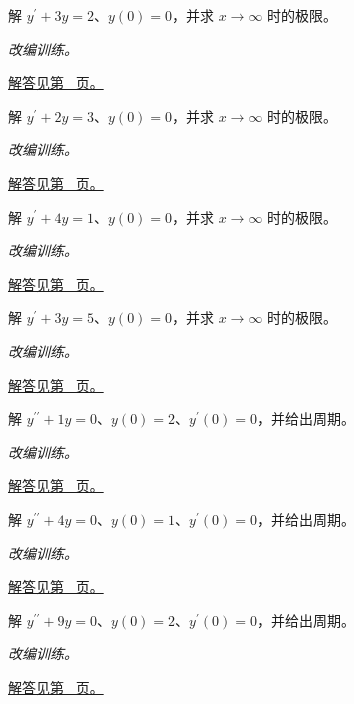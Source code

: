 \documentclass[12pt,fontset=fandol]{ctexart}
\begin{document}
\begin{example}[积分因子解线性方程]\label{ex:c22q15}
解 $y^{\prime}+3y=2$、$y(0)=0$，并求 $x\to\infty$ 时的极限。
\par\textit{改编训练。}\par\hyperref[ans:c22q15]{解答见第~\pageref{ans:c22q15} 页。}
\end{example}
\begin{example}[积分因子解线性方程]\label{ex:c22q16}
解 $y^{\prime}+2y=3$、$y(0)=0$，并求 $x\to\infty$ 时的极限。
\par\textit{改编训练。}\par\hyperref[ans:c22q16]{解答见第~\pageref{ans:c22q16} 页。}
\end{example}
\begin{example}[积分因子解线性方程]\label{ex:c22q17}
解 $y^{\prime}+4y=1$、$y(0)=0$，并求 $x\to\infty$ 时的极限。
\par\textit{改编训练。}\par\hyperref[ans:c22q17]{解答见第~\pageref{ans:c22q17} 页。}
\end{example}
\begin{example}[积分因子解线性方程]\label{ex:c22q18}
解 $y^{\prime}+3y=5$、$y(0)=0$，并求 $x\to\infty$ 时的极限。
\par\textit{改编训练。}\par\hyperref[ans:c22q18]{解答见第~\pageref{ans:c22q18} 页。}
\end{example}
\begin{example}[简谐振动初值问题]\label{ex:c22q19}
解 $y^{\prime\prime}+1y=0$、$y(0)=2$、$y^{\prime}(0)=0$，并给出周期。
\par\textit{改编训练。}\par\hyperref[ans:c22q19]{解答见第~\pageref{ans:c22q19} 页。}
\end{example}
\begin{example}[简谐振动初值问题]\label{ex:c22q20}
解 $y^{\prime\prime}+4y=0$、$y(0)=1$、$y^{\prime}(0)=0$，并给出周期。
\par\textit{改编训练。}\par\hyperref[ans:c22q20]{解答见第~\pageref{ans:c22q20} 页。}
\end{example}
\begin{example}[简谐振动初值问题]\label{ex:c22q21}
解 $y^{\prime\prime}+9y=0$、$y(0)=2$、$y^{\prime}(0)=0$，并给出周期。
\par\textit{改编训练。}\par\hyperref[ans:c22q21]{解答见第~\pageref{ans:c22q21} 页。}
\end{example}
\end{document}
